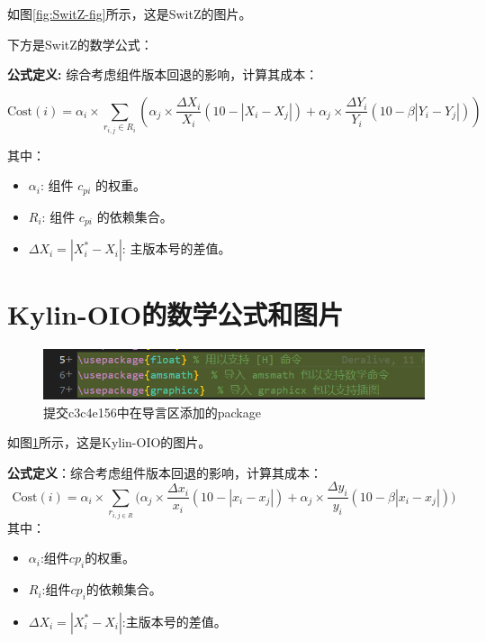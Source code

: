 \documentclass{article}
\begin{document}
如图\ref{fig:SwitZ-fig}所示，这是SwitZ的图片。

下方是SwitZ的数学公式：

\textbf{公式定义:} 综合考虑组件版本回退的影响，计算其成本：

$$
    \text{Cost}(i) = \alpha_i \times \sum_{r_{i,j} \in R_i} \left( \alpha_j \times \frac{\Delta X_i}{X_i} (10 - |X_i - X_j|) + \alpha_j \times \frac{\Delta Y_i}{Y_i} (10 - \beta |Y_i - Y_j|) \right)
$$

其中：

\begin{itemize}
    \item $\alpha_i$: 组件 $c_{pi}$ 的权重。
    \item $R_i$: 组件 $c_{pi}$ 的依赖集合。
    \item $\Delta X_i = |X_i^* - X_i|$: 主版本号的差值。
\end{itemize}

\section{Kylin-OIO的数学公式和图片}
\begin{figure}[htbp]
    \centering
    \includegraphics[width=\textwidth]{img/kylinoio_screenshot}
    \caption{提交c3c4e156中在导言区添加的package}
    \label{kylinoio_screenshot}
\end{figure}

如图\ref{kylinoio_screenshot}所示，这是Kylin-OIO的图片。

\textbf{{\heiti 公式定义}}：综合考虑组件版本回退的影响，计算其成本：
$$
    \text{Cost}(i)=\alpha_i\times\sum_{r_{i,j\in R}}\bigg(\alpha_{j}\times\frac{\Delta x_{i}}{x_{i}}(10-|x_{i}-x_{j}|)+\alpha_{j}\times\frac{\Delta y_{i}}{y_{i}}(10-\beta |x_{i}-x_{j}|)\bigg)
$$
其中：
\begin{itemize}
\item $\alpha_{i}$:组件$cp_{i}$的权重。
\item $R_{i}$:组件$cp_{i}$的依赖集合。
\item $\Delta X_{i}=|X_{i}^{*}-X_{i}|$:主版本号的差值。
\end{itemize}
\end{document}
